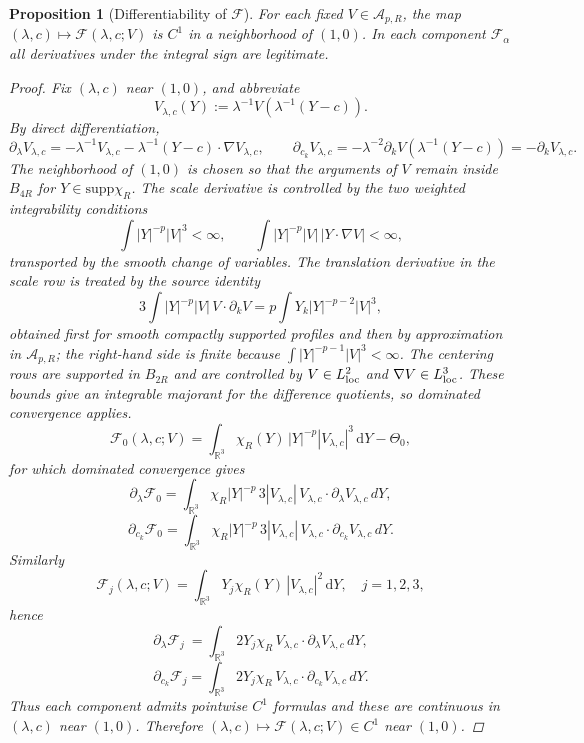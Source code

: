 \documentclass[11pt]{amsart}
\theoremstyle{plain}
\newtheorem{proposition}[theorem]{Proposition}
\theoremstyle{definition}
\theoremstyle{remark}
\newcommand{\dd}{\mathrm d}
\newcommand{\RR}{\mathbb R}
\newcommand{\supp}{\mathrm{supp}}
\begin{document}
\begin{proposition}[Differentiability of \(\mathcal F\)]\label{prop:gauge-C1}
For each fixed \(V\in\mathcal A_{p,R}\), the map
\((\lambda,c)\mapsto \mathcal F(\lambda,c;V)\) is \(C^1\) in a neighborhood of
\((1,0)\). In each component \( \mathcal F_\alpha\) all derivatives under the
integral sign are legitimate.
\begin{proof}
Fix \((\lambda,c)\) near \((1,0)\), and abbreviate
\[
V_{\lambda,c}(Y):=\lambda^{-1}V\!\left(\lambda^{-1}(Y-c)\right).
\]
By direct differentiation,
\[
\partial_\lambda V_{\lambda,c}
=-\lambda^{-1}V_{\lambda,c}-\lambda^{-1}(Y-c)\cdot\nabla V_{\lambda,c},\qquad
\partial_{c_k}V_{\lambda,c}=-\lambda^{-2}\partial_kV(\lambda^{-1}(Y-c))=-\partial_kV_{\lambda,c}.
\]
The neighborhood of \((1,0)\) is chosen so that the arguments of \(V\) remain
inside \(B_{4R}\) for \(Y\in\supp\chi_R\). The scale derivative is controlled by
the two weighted integrability conditions
\[
\int |Y|^{-p}|V|^3<\infty,\qquad
\int |Y|^{-p}|V|\,|Y\cdot\nabla V|<\infty,
\]
transported by the smooth change of variables. The translation derivative in
the scale row is treated by the source identity
\[
3\int |Y|^{-p}|V|\,V\cdot\partial_kV
=p\int Y_k|Y|^{-p-2}|V|^3,
\]
obtained first for smooth compactly supported profiles and then by approximation
in \(\mathcal A_{p,R}\); the right-hand side is finite because
\(\int |Y|^{-p-1}|V|^3<\infty\). The centering rows are supported in \(B_{2R}\)
and are controlled by \(V\in L^2_{\rm loc}\) and \(\nabla V\in L^3_{\rm loc}\).
These bounds give an integrable majorant for the difference quotients, so
dominated convergence applies.
\[
\mathcal F_0(\lambda,c;V)
=\int_{\RR^3}\chi_R(Y)\,|Y|^{-p}|V_{\lambda,c}|^3\,\dd Y-\Theta_0,
\]
for which dominated convergence gives
\[
\partial_{\lambda}\mathcal F_0
=\int_{\RR^3}\chi_R|Y|^{-p}\,3|V_{\lambda,c}|\,V_{\lambda,c}\cdot\partial_\lambda V_{\lambda,c}\,dY,
\]
\[
\partial_{c_k}\mathcal F_0
=\int_{\RR^3}\chi_R|Y|^{-p}\,3|V_{\lambda,c}|\,V_{\lambda,c}\cdot\partial_{c_k}V_{\lambda,c}\,dY.
\]
Similarly
\[
\mathcal F_j(\lambda,c;V)=\int_{\RR^3}Y_j\chi_R(Y)\,|V_{\lambda,c}|^2\,\dd Y,\quad j=1,2,3,
\]
hence
\[
\partial_\lambda \mathcal F_j
\ =\int_{\RR^3}2Y_j\chi_R\,V_{\lambda,c}\cdot\partial_\lambda V_{\lambda,c}\,dY,
\]
\[
\partial_{c_k}\mathcal F_j
=\int_{\RR^3}2Y_j\chi_R\,V_{\lambda,c}\cdot\partial_{c_k}V_{\lambda,c}\,dY.
\]
Thus each component admits pointwise \(C^1\) formulas and these are continuous in
\((\lambda,c)\) near \((1,0)\). Therefore \((\lambda,c)\mapsto\mathcal F(\lambda,c;V)\in C^1\)
near \((1,0)\).
\end{proof}
\end{proposition}
\end{document}
